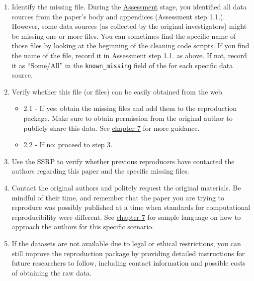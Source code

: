 \documentclass[
]{book}
\providecommand{\tightlist}{%
  \setlength{\itemsep}{0pt}\setlength{\parskip}{0pt}}
\begin{document}
\begin{enumerate}
\def\labelenumi{\arabic{enumi}.}
\tightlist
\item
  Identify the missing file. During the \protect\hyperlink{assessment}{Assessment} stage, you identified all data sources from the paper's body and appendices (Assessment step 1.1.). However, some data sources (as collected by the original investigators) might be missing one or more files. You can sometimes find the specific name of those files by looking at the beginning of the cleaning code scripts. If you find the name of the file, record it in Assessment step 1.1. as above. If not, record it as ``Some/All'' in the \texttt{known\_missing} field of the for each specific data source.\\
\item
  Verify whether this file (or files) can be easily obtained from the web.

  \begin{itemize}
  \tightlist
  \item
    2.1 - If yes: obtain the missing files and add them to the reproduction package. Make sure to obtain permission from the original author to publicly share this data. See \href{https://bitss.github.io/ACRE/guidance-for-a-constructive-exchange-between-reproducers-and-original-authors.html}{chapter 7} for more guidance.\\
  \item
    2.2 - If no: proceed to step 3.\\
  \end{itemize}
\item
  Use the SSRP to verify whether previous reproducers have contacted the authors regarding this paper and the specific missing files.\\
\item
  Contact the original authors and politely request the original materials. Be mindful of their time, and remember that the paper you are trying to reproduce was possibly published at a time when standards for computational reproducibility were different. See \href{https://bitss.github.io/ACRE/guidance-for-a-constructive-exchange-between-reproducers-and-original-authors.html}{chapter 7} for sample language on how to approach the authors for this specific scenario.\\
\item
  If the datasets are not available due to legal or ethical restrictions, you can still improve the reproduction package by providing detailed instructions for future researchers to follow, including contact information and possible costs of obtaining the raw data.
\end{enumerate}
\end{document}
